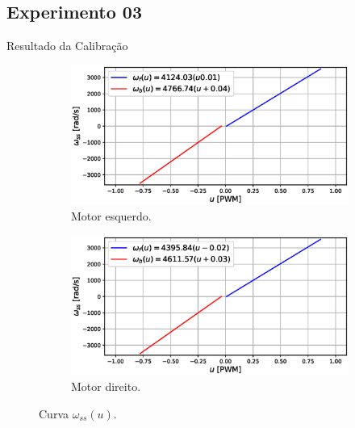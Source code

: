 \subsection{Experimento 03}
\begin{frame}{Resultado da Calibração}

\begin{figure}
    \begin{subfigure}{.48\textwidth}
    \centering
        \includegraphics[width=1.15\textwidth]{figuras/resultados/exp03/curva_feedforward_esquerdo100.eps}
        \caption{Motor esquerdo.}
    \end{subfigure}
    \begin{subfigure}{.48\textwidth}
        \centering
        \includegraphics[width=1.15\textwidth]{figuras/resultados/exp03/curva_feedforward_direito100.eps}
        \caption{Motor direito.}
    \end{subfigure}
    \caption{Curva $\omega_{ss}(u)$.}
\end{figure}

\end{frame}


